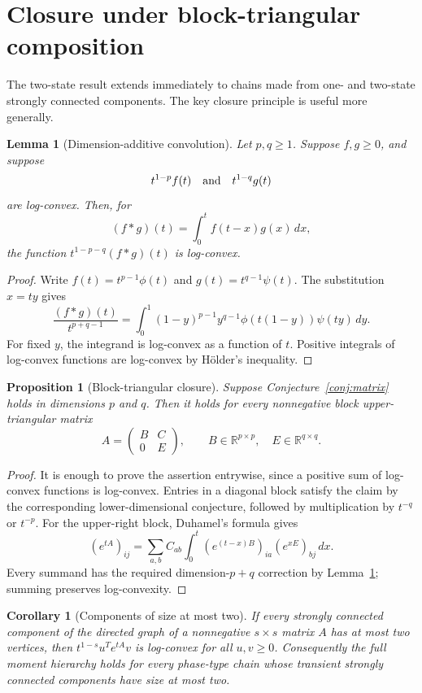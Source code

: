 \documentclass[11pt]{article}
\newtheorem{lemma}[theorem]{Lemma}
\newtheorem{proposition}[theorem]{Proposition}
\newtheorem{corollary}[theorem]{Corollary}
\theoremstyle{remark}
\begin{document}
\section{Closure under block-triangular composition}

The two-state result extends immediately to chains made from one- and
two-state strongly connected components.  The key closure principle is useful
more generally.

\begin{lemma}[Dimension-additive convolution]\label{lem:convolution}
Let $p,q\geq1$.  Suppose $f,g\geq0$, and suppose
\[
 t^{1-p}f(t)\quad\hbox{and}\quad t^{1-q}g(t)
\]
are log-convex.  Then, for
\[
 (f*g)(t)=\int_0^t f(t-x)g(x)\,dx,
\]
the function $t^{1-p-q}(f*g)(t)$ is log-convex.
\end{lemma}

\begin{proof}
Write $f(t)=t^{p-1}\phi(t)$ and
$g(t)=t^{q-1}\psi(t)$.  The substitution $x=ty$ gives
\[
 \frac{(f*g)(t)}{t^{p+q-1}}
 =\int_0^1(1-y)^{p-1}y^{q-1}
   \phi(t(1-y))\psi(ty)\,dy.
\]
For fixed $y$, the integrand is log-convex as a function of $t$.
Positive integrals of log-convex functions are log-convex by H\"older's
inequality.
\end{proof}

\begin{proposition}[Block-triangular closure]\label{prop:block-closure}
Suppose Conjecture~\ref{conj:matrix} holds in dimensions $p$ and $q$.
Then it holds for every nonnegative block upper-triangular matrix
\[
 A=\begin{pmatrix}B&C\\0&E\end{pmatrix},
 \qquad B\in\mathbb R^{p\times p},\quad
 E\in\mathbb R^{q\times q}.
\]
\end{proposition}

\begin{proof}
It is enough to prove the assertion entrywise, since a positive sum of
log-convex functions is log-convex.  Entries in a diagonal block satisfy the
claim by the corresponding lower-dimensional conjecture, followed by
multiplication by $t^{-q}$ or $t^{-p}$.  For the upper-right block, Duhamel's
formula gives
\[
 (e^{tA})_{ij}
 =\sum_{a,b}C_{ab}\int_0^t
   (e^{(t-x)B})_{ia}(e^{xE})_{bj}\,dx.
\]
Every summand has the required dimension-$p+q$ correction by
Lemma~\ref{lem:convolution}; summing preserves log-convexity.
\end{proof}

\begin{corollary}[Components of size at most two]
If every strongly connected component of the directed graph of a nonnegative
$s\times s$ matrix $A$ has at most two vertices, then
$t^{1-s}u^Te^{tA}v$ is log-convex for all $u,v\geq0$.  Consequently the
full moment hierarchy holds for every phase-type chain whose transient
strongly connected components have size at most two.
\end{corollary}
\end{document}
